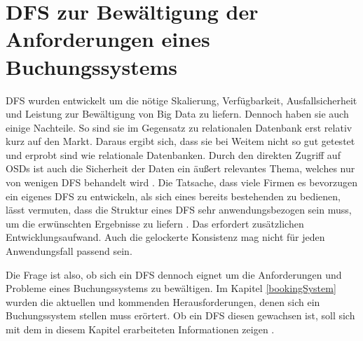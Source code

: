 \documentclass[12pt,oneside,a4paper,parskip]{scrbook}
\begin{document}
\section{DFS zur Bewältigung der Anforderungen eines Buchungssystems}
DFS wurden entwickelt um die nötige Skalierung, Verfügbarkeit, Ausfallsicherheit und Leistung zur Bewältigung von Big Data zu liefern. Dennoch haben sie auch einige Nachteile. So sind sie im Gegensatz zu relationalen Datenbank erst relativ kurz auf den Markt. Daraus ergibt sich, dass sie bei Weitem nicht so gut getestet und erprobt sind wie relationale Datenbanken. Durch den direkten Zugriff auf OSDs ist auch die Sicherheit der Daten ein äußert relevantes Thema, welches nur von wenigen DFS behandelt wird \cite{dfsDrawbacks}\cite{cephDrawbacks}. Die Tatsache, dass viele Firmen es bevorzugen ein eigenes DFS zu entwickeln, als sich eines bereits bestehenden zu bedienen, lässt vermuten, dass die Struktur eines DFS sehr anwendungsbezogen sein muss, um die erwünschten Ergebnisse zu liefern \cite{GFS}\cite{haystack}. Das erfordert zusätzlichen Entwicklungsaufwand. Auch die gelockerte Konsistenz mag nicht für jeden Anwendungsfall passend sein. 

Die Frage ist also, ob sich ein DFS dennoch eignet um die Anforderungen und Probleme eines Buchungssystems zu bewältigen.
Im Kapitel \ref{bookingSystem} wurden die aktuellen und kommenden Herausforderungen, denen sich ein Buchungssystem stellen muss erörtert. Ob ein DFS diesen gewachsen ist, soll sich mit dem in diesem Kapitel erarbeiteten Informationen zeigen \cite{largeHadoop}.
\end{document}
